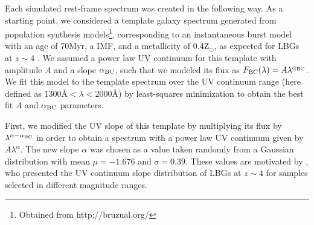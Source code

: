 \documentclass[iop, revtex4]{emulateapj}
\begin{document}
Each simulated rest-frame spectrum was created in the following
way. As a starting point, we considered a template galaxy spectrum
generated from \citet{Bruzual03} population synthesis
models\footnote{Obtained from http://bruzual.org/}, corresponding to
an instantaneous burst model with an age of 70Myr, a
\citet{Chabrier03} IMF, and a metallicity of 0.4Z$_{\odot}$, as
expected for LBGs at $z\sim4$ \citep{Jones12}. We assumed a power law
UV continuum for this template with amplitude $A$ and a slope
$\alpha_{\rm BC}$, such that we modeled its flux as $F_{\rm
  BC}(\lambda) = A \lambda^{\alpha_{\rm BC}}$. We fit this model to
the template spectrum over the UV continuum range (here defined as
1300\AA $<\lambda<$2000\AA) by least-squares minimization to
obtain the best fit $A$ and $\alpha_{\rm BC}$ parameters.

First, we modified the UV slope of this template by multiplying its flux by $\lambda^{\alpha - \alpha_{\rm BC}}$ in
order to obtain a spectrum with a power law UV continuum given by $A \lambda^{\alpha}$. The new slope $\alpha$ was chosen as a value taken randomly from
a Gaussian distribution with mean $\mu=-1.676$ and $\sigma=0.39$. These
values are motivated by \citet{Bouwens09}, who presented the UV
continuum slope distribution of LBGs at $z\sim4$ for samples selected
in different magnitude ranges.
\end{document}
